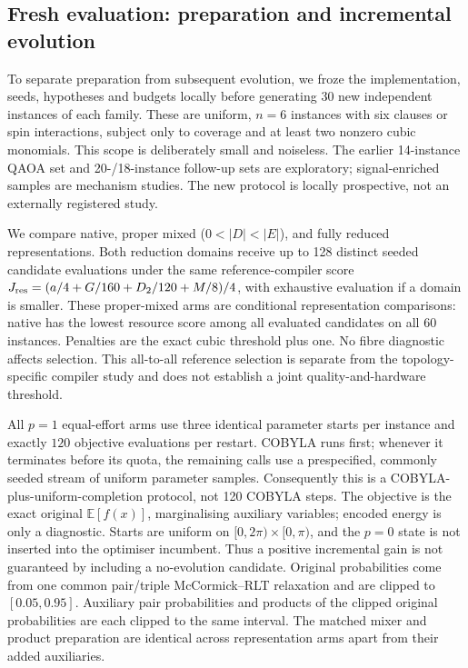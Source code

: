 \subsection{Fresh evaluation: preparation and incremental evolution}

\label{sec:fresh-qaoa}

To separate preparation from subsequent evolution, we froze the implementation, seeds, hypotheses and budgets locally before generating 30 new independent instances of each family. These are uniform, $n=6$ instances with six clauses or spin interactions, subject only to coverage and at least two nonzero cubic monomials. This scope is deliberately small and noiseless. The earlier 14-instance QAOA set and 20-/18-instance follow-up sets are exploratory; signal-enriched samples are mechanism studies. The new protocol is locally prospective, not an externally registered study.

We compare native, proper mixed ($0<|D|<|E|$), and fully reduced representations. Both reduction domains receive up to 128 distinct seeded candidate evaluations under the same reference-compiler score $J_{\rm res}=(a/4+G/160+D_2/120+M/8)/4$, with exhaustive evaluation if a domain is smaller. These proper-mixed arms are conditional representation comparisons: native has the lowest resource score among all evaluated candidates on all 60 instances. Penalties are the exact cubic threshold plus one. No fibre diagnostic affects selection. This all-to-all reference selection is separate from the topology-specific compiler study and does not establish a joint quality-and-hardware threshold.

All $p=1$ equal-effort arms use three identical parameter starts per instance and exactly $120$ objective evaluations per restart. COBYLA runs first; whenever it terminates before its quota, the remaining calls use a prespecified, commonly seeded stream of uniform parameter samples. Consequently this is a COBYLA-plus-uniform-completion protocol, not 120 COBYLA steps. The objective is the exact original $\mathbb E[f(x)]$, marginalising auxiliary variables; encoded energy is only a diagnostic. Starts are uniform on $[0,2\pi)\times[0,\pi)$, and the $p=0$ state is not inserted into the optimiser incumbent. Thus a positive incremental gain is not guaranteed by including a no-evolution candidate. Original probabilities come from one common pair/triple McCormick--RLT relaxation and are clipped to $[0.05,0.95]$. Auxiliary pair probabilities and products of the clipped original probabilities are each clipped to the same interval. The matched mixer and product preparation are identical across representation arms apart from their added auxiliaries.


